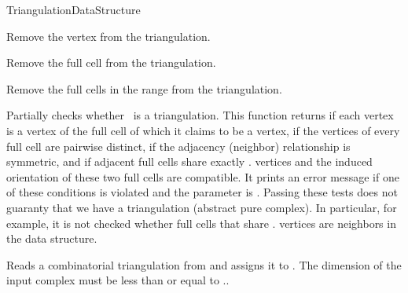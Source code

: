 \begin{ccRefConcept}{TriangulationDataStructure}
\begin{ccAdvanced}

{Remove the vertex  from the triangulation. 
}

{Remove the full cell  from the triangulation. 
}

{Remove the full cells in the range \ccc{[start,end)} from the triangulation.
}

\end{ccAdvanced}



\begin{ccDebug}

{Partially checks whether \ccVar\ is a triangulation. This function
returns  if each vertex is a vertex of the full cell of which it
claims to be a vertex, if the vertices of every full cell are pairwise distinct,
if the adjacency (neighbor) relationship is symmetric, and if adjacent full cells share
exactly \ccVar. vertices and the induced
orientation of these two full cells are compatible.
 It prints an error message
if one of these conditions is violated and the  parameter is
. Passing these tests does not guaranty that we have a
triangulation (abstract pure
complex). In particular, for example, it is not
checked whether full cells that share \ccVar. vertices
are neighbors in the data structure.}

\end{ccDebug}



{Reads a combinatorial triangulation from  and assigns it to
. \ccPrecond The dimension of the input complex must be less than or
equal to \ccVar..}


\end{ccRefConcept}
